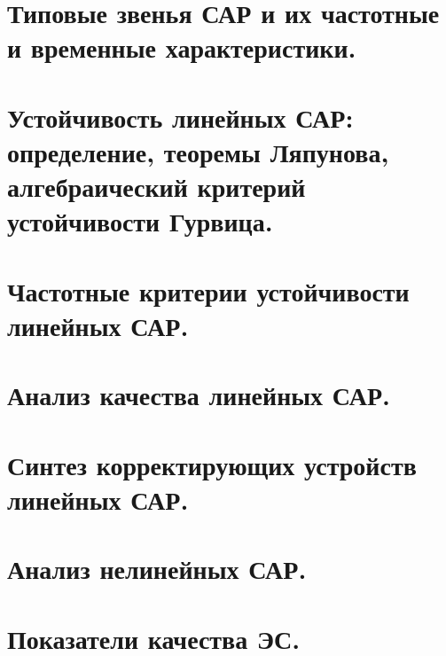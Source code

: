 \documentclass[unicode, 12pt, a4paper, oneside]{article}
\begin{document}
\section{Типовые звенья САР и их частотные и временные характеристики.}

\section{Устойчивость линейных САР: определение, теоремы Ляпунова, алгебраический критерий устойчивости Гурвица.}

\section{Частотные критерии устойчивости линейных САР.}

\section{Анализ качества линейных САР.}

\section{Синтез корректирующих устройств линейных САР.}

\section{Анализ нелинейных САР.}

\section{Показатели качества ЭС.}
\end{document}
